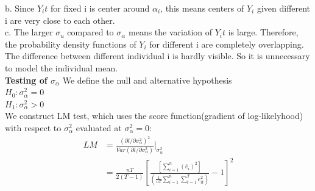 \documentclass[a4paper]{article}
\begin{document}
b. Since $Y_it$ for fixed i is center around $\alpha_i$, this means centers of $Y_i$ given different i are very close to each other.\\
c. The larger $\sigma_u$ compared to $\sigma_{\alpha}$ means the variation of $Y_it$ is large. Therefore, the probability density functions of $Y_i$ for different i are completely overlapping. The difference between different individual i is hardly visible. So it is unnecessary to model the individual mean. \\
{\bf Testing of $\sigma_{\alpha}$}
We define the null and alternative hypothesis\\
$H_0: \sigma^2_{\alpha} = 0$ \\
$H_1: \sigma^2_{\alpha} > 0$ \\
We construct LM test, which uses the score function(gradient of log-likelyhood) with respect to $\sigma^2_\alpha$ evaluated at $\sigma^2_\alpha=0$:
\begin{align*}
LM & = \frac{(\partial l/\partial\sigma^2_{\alpha})^2}{Var(\partial l/\partial\sigma^2_{\alpha})}|_{\sigma^2_{\alpha}}\\
& = \frac{nT}{2(T-1)}[\frac{[\sum_{i=1}^n(\bar e_i)^2]}{(\frac{1}{nT}\sum_{i=1}^{n}\sum_{t=1}^Te^2_{it})}-1]^2\\
\end{align*}
\end{document}
